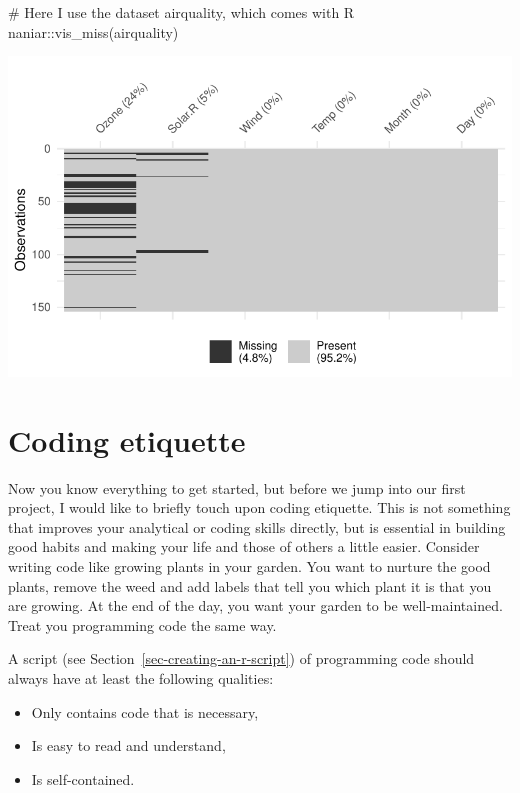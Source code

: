 \documentclass[
  letterpaper,
]{krantz}
\makeatletter
\newenvironment{Shaded}{\begin{snugshade}}{\end{snugshade}}
\newcommand{\CommentTok}[1]{\textcolor[rgb]{0.37,0.37,0.37}{#1}}
\newcommand{\FunctionTok}[1]{\textcolor[rgb]{0.28,0.35,0.67}{#1}}
\newcommand{\NormalTok}[1]{\textcolor[rgb]{0.00,0.23,0.31}{#1}}
\newcommand{\SpecialCharTok}[1]{\textcolor[rgb]{0.37,0.37,0.37}{#1}}
\newenvironment{kframe}{%
\medskip{}
\setlength{\fboxsep}{.8em}
 \def\at@end@of@kframe{}%
 \ifinner\ifhmode%
  \def\at@end@of@kframe{\end{minipage}}%
  \begin{minipage}{\columnwidth}%
 \fi\fi%
 \def\FrameCommand##1{\hskip\@totalleftmargin \hskip-\fboxsep
 \colorbox{shadecolor}{##1}\hskip-\fboxsep
     \hskip-\linewidth \hskip-\@totalleftmargin \hskip\columnwidth}%
 \MakeFramed {\advance\hsize-\width
   \@totalleftmargin\z@ \linewidth\hsize
   \@setminipage}}%
 {\par\unskip\endMakeFramed%
 \at@end@of@kframe}
\renewenvironment{Shaded}{\begin{kframe}}{\end{kframe}}
\makeatother
\begin{document}
\begin{Shaded}
\begin{Highlighting}[]
\CommentTok{\# Here I use the dataset \textquotesingle{}airquality\textquotesingle{}, which comes with R}
\NormalTok{naniar}\SpecialCharTok{::}\FunctionTok{vis\_miss}\NormalTok{(airquality)}
\end{Highlighting}
\end{Shaded}

\includegraphics{05_r_basics_files/figure-latex/explicitly-calling-functions-1.pdf}

\section{Coding etiquette}\label{sec-coding-etiquette}

Now you know everything to get started, but before we jump into our
first project, I would like to briefly touch upon coding etiquette. This
is not something that improves your analytical or coding skills
directly, but is essential in building good habits and making your life
and those of others a little easier. Consider writing code like growing
plants in your garden. You want to nurture the good plants, remove the
weed and add labels that tell you which plant it is that you are
growing. At the end of the day, you want your garden to be
well-maintained. Treat you programming code the same way.

A script (see Section~\ref{sec-creating-an-r-script}) of programming
code should always have at least the following qualities:

\begin{itemize}
\item
  Only contains code that is necessary,
\item
  Is easy to read and understand,
\item
  Is self-contained.
\end{itemize}
\end{document}
